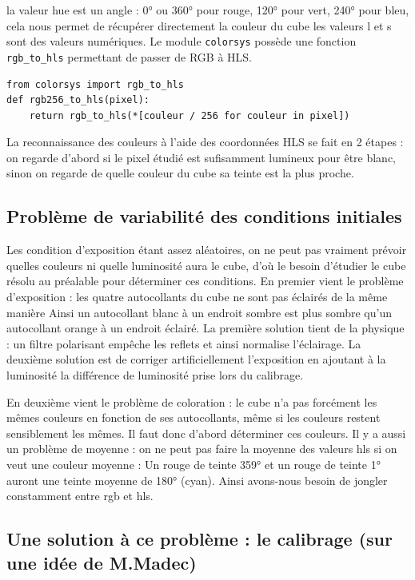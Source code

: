 \documentclass[11pt,a4paper]{article}
\begin{document}
la valeur hue est un angle : 0° ou 360° pour rouge, 120° pour vert, 240° pour bleu, cela nous permet de récupérer directement la couleur du cube
les valeurs l et s sont des valeurs numériques. Le module \texttt{colorsys} possède une fonction \texttt{rgb\_to\_hls} permettant de passer de RGB à HLS.
\begin{lstlisting}
from colorsys import rgb_to_hls
def rgb256_to_hls(pixel):
    return rgb_to_hls(*[couleur / 256 for couleur in pixel])
\end{lstlisting}
La reconnaissance des couleurs à l'aide des coordonnées HLS se fait en 2 étapes : on regarde d'abord si le
pixel étudié est sufisamment lumineux pour être blanc, sinon on regarde de quelle couleur du cube sa teinte est la plus proche.

	\subsection{Problème de variabilité des conditions initiales}
    Les condition d'exposition étant assez aléatoires, on ne peut pas vraiment prévoir quelles couleurs ni quelle luminosité aura le cube,
d'où le besoin d'étudier le cube résolu au préalable pour déterminer ces conditions.
    En premier vient le problème d'exposition : les quatre autocollants du cube ne sont pas éclairés de la même manière
Ainsi un autocollant blanc à un endroit sombre est plus sombre qu'un autocollant orange à un endroit éclairé.
    La première solution tient de la physique : un filtre polarisant empêche les reflets et ainsi normalise l'éclairage.
    La deuxième solution est de corriger artificiellement l'exposition en ajoutant à la luminosité la différence de luminosité prise lors du calibrage.

    En deuxième vient le problème de coloration : le cube n'a pas forcément les mêmes couleurs en fonction de ses
autocollants, même si les couleurs restent sensiblement les mêmes. Il faut donc d'abord déterminer ces couleurs.
Il y a aussi un problème de moyenne : on ne peut pas faire la moyenne des valeurs hls si on veut une couleur moyenne :
Un rouge de teinte 359° et un rouge de teinte 1° auront une teinte moyenne de 180° (cyan). Ainsi avons-nous besoin de jongler constamment entre rgb et hls.

	\subsection{Une solution à ce problème : le calibrage {\small (sur une idée de M.Madec)}}
	
\end{document}
